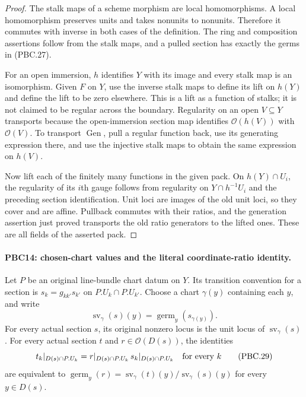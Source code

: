 \begin{proof}
The stalk maps of a scheme morphism are local homomorphisms.
A local homomorphism preserves units and takes nonunits to nonunits.
Therefore it commutes with inverse in both cases of the definition.
The ring and composition assertions follow from the stalk maps,
and a pulled section has exactly the germs in (PBC.27).

For an open immersion, $h$ identifies $Y$ with its image and
every stalk map is an isomorphism.  Given $F$ on $Y$, use the
inverse stalk maps to define its lift on $h(Y)$ and define the
lift to be zero elsewhere.  This is a lift as a function of
stalks; it is not claimed to be regular across the boundary.
Regularity on an open $V\subseteq Y$ transports because the
open-immersion section map identifies $\mathcal O(h(V))$ with
$\mathcal O(V)$.  To transport $\operatorname{Gen}$, pull a
regular function back, use its generating expression there, and
use the injective stalk maps to obtain the same expression on
$h(V)$.

Now lift each of the finitely many functions in the given pack.
On $h(Y)\cap U_i$, the regularity of its $i$th gauge follows
from regularity on $Y\cap h^{-1}U_i$ and the preceding section
identification.  Unit loci are images of the old unit loci,
so they cover and are affine.  Pullback commutes with their
ratios, and the generation assertion just proved transports
the old ratio generators to the lifted ones.  These are all
fields of the asserted pack.
\end{proof}

\paragraph{PBC14: chosen-chart values and the literal coordinate-ratio identity.}
\label{claim:PBC14}
Let $P$ be an original line-bundle chart datum on $Y$.
Its transition convention for a section is
$s_k=g_{kk'}s_{k'}$ on $P.U_k\cap P.U_{k'}$.
Choose a chart $\gamma(y)$ containing each $y$, and write
\[
 \operatorname{sv}_\gamma(s)(y)
       =\operatorname{germ}_y(s_{\gamma(y)}).
                                                        \tag{PBC.28}
\]
For every actual section $s$, its original nonzero locus is the
unit locus of $\operatorname{sv}_\gamma(s)$.  For every actual
section $t$ and $r\in\mathcal O(D(s))$, the identities
\[
 t_k|_{D(s)\cap P.U_k}
   =r|_{D(s)\cap P.U_k}\,s_k|_{D(s)\cap P.U_k}
       \quad\hbox{for every }k
                                                        \tag{PBC.29}
\]
are equivalent to
$\operatorname{germ}_y(r)=
\operatorname{sv}_\gamma(t)(y)/
\operatorname{sv}_\gamma(s)(y)$ for every $y\in D(s)$.

